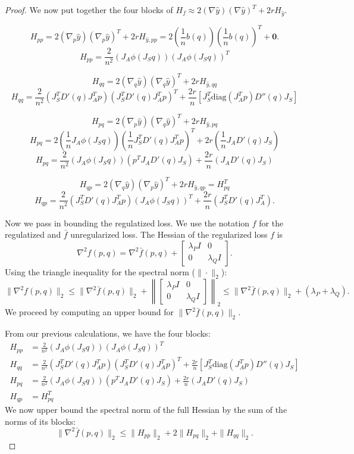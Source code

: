 \documentclass[a4paper,11pt]{article}
\newcommand{\1}{\mathbbm{1}}
\theoremstyle{plain}
\newcommand{\diag}{\mathrm{diag}}
\begin{document}
\begin{proof}
We now put together the four blocks of $H_f \approx 2 (\nabla \hat{y}) (\nabla \hat{y})^T + 2r H_{\hat{y}}$.

$$
H_{pp} = 2 (\nabla_p \hat{y}) (\nabla_p \hat{y})^T + 2r H_{\hat{y}, pp} = 2 \left( \frac{1}{n} b(q) \right) \left( \frac{1}{n} b(q) \right)^T + \mathbf{0}.
$$
$$
H_{pp} = \frac{2}{n^2} (J_A \phi(J_S q)) (J_A \phi(J_S q))^T
$$

$$
H_{qq} = 2 (\nabla_q \hat{y}) (\nabla_q \hat{y})^T + 2r H_{\hat{y}, qq}
$$
$$
H_{qq} = \frac{2}{n^2} \left( J_S^T D'(q) J_A^T p \right) \left(J_S^T D'(q) J_A^T p \right)^T + \frac{2r}{n} \left[ J_S^T \diag(J_A^T p) D''(q) J_S \right]
$$

$$
H_{pq} = 2 (\nabla_p \hat{y}) (\nabla_q \hat{y})^T + 2r H_{\hat{y}, pq}
$$
$$
H_{pq} = 2 \left( \frac{1}{n} J_A \phi(J_S q) \right) \left( \frac{1}{n} J_S^T D'(q) J_A^T p \right)^T + 2r \left( \frac{1}{n} J_A D'(q) J_S \right)
$$
$$
H_{pq} = \frac{2}{n^2} (J_A \phi(J_S q)) (p^T J_A D'(q) J_S) + \frac{2r}{n} (J_A D'(q) J_S)
$$

$$
H_{qp} = 2 (\nabla_q \hat{y}) (\nabla_p \hat{y})^T + 2r H_{\hat{y}, qp} = H_{pq}^T
$$
$$
H_{qp} = \frac{2}{n^2} (J_S^T D'(q) J_A^T p) (J_A \phi(J_S q))^T + \frac{2r}{n} (J_S^T D'(q) J_A^T).
$$

Now we pass in bounding the regulatized loss.
We use the notation $f$ for the regulatized and $\bar{f}$ unregularized loss.
The Hessian of the regularized loss $f$ is
$$
    \nabla^2 f(p, q) = \nabla^2 \bar{f}(p, q) + \begin{bmatrix} \lambda_P I & 0 \\ 0 & \lambda_Q I \end{bmatrix}.
$$
Using the triangle inequality for the spectral norm ($\|\cdot\|_2$):
\begin{equation*}
    \|\nabla^2 f(p, q)\|_2 \leq \|\nabla^2 \bar{f}(p, q)\|_2 + \left\| \begin{bmatrix} \lambda_P I & 0 \\ 0 & \lambda_Q I \end{bmatrix} \right\|_2 \leq \|\nabla^2 \bar{f}(p, q)\|_2+(\lambda_P + \lambda_Q).
\end{equation*}
We proceed by computing an upper bound for $\|\nabla^2 \bar{f}(p, q)\|_2$.

From our previous calculations, we have the four blocks:
\begin{align*}
    H_{pp} &= \frac{2}{n^2} (J_A \phi(J_S q)) (J_A \phi(J_S q))^T \\
    H_{qq} &= \frac{2}{n^2} (J_S^T D'(q) J_A^T p) (J_S^T D'(q) J_A^T p)^T + \frac{2r}{n} \left[ J_S^T \diag(J_A^T p) D''(q) J_S \right] \\
    H_{pq} &= \frac{2}{n^2} (J_A \phi(J_S q)) (p^T J_A D'(q) J_S) + \frac{2r}{n} (J_A D'(q) J_S) \\
    H_{qp} &= H_{pq}^T
\end{align*}
We now upper bound the spectral norm of the full Hessian by the sum of the norms of its blocks:
\begin{equation*}
    \| \nabla^2 \bar{f}(p, q) \|_2 \leq \|H_{pp}\|_2 + 2 \|H_{pq}\|_2 + \|H_{qq}\|_2.
\end{equation*}


\end{proof}
\end{document}
